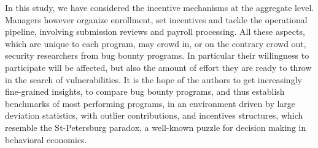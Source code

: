 In this study, we have considered the incentive mechanisms at the aggregate level. Managers however organize enrollment, set incentives and tackle the operational pipeline, involving submission reviews and payroll processing. All these aspects, which are unique to each program, may crowd in, or on the contrary crowd out, security researchers from bug bounty programs. In particular their willingness to participate will be affected, but also the amount of effort they are ready to throw in the search of vulnerabilities. It is the hope of the authors to get increasingly fine-grained insights, to compare bug bounty programs, and thus establish benchmarks of most performing programs, in an environment driven by large deviation statistics, with outlier contributions, and incentives structures, which resemble the St-Petersburg paradox, a well-known puzzle for decision making in behavioral economics.
